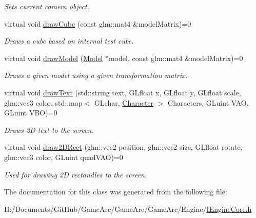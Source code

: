 \begin{DoxyCompactItemize}
\begin{DoxyCompactList}\small\item\em Sets current camera object. \end{DoxyCompactList}\item 
\hypertarget{class_i_engine_core_af24745492d6a7c8bd410a6849fbaf854}{virtual void \hyperlink{class_i_engine_core_af24745492d6a7c8bd410a6849fbaf854}{draw\+Cube} (const glm\+::mat4 \&model\+Matrix)=0}\label{class_i_engine_core_af24745492d6a7c8bd410a6849fbaf854}

\begin{DoxyCompactList}\small\item\em Draws a cube based on internal test cube. \end{DoxyCompactList}\item 
\hypertarget{class_i_engine_core_a45f78f207ced5253b7323f4dcb637c2d}{virtual void \hyperlink{class_i_engine_core_a45f78f207ced5253b7323f4dcb637c2d}{draw\+Model} (\hyperlink{class_model}{Model} $\ast$model, const glm\+::mat4 \&model\+Matrix)=0}\label{class_i_engine_core_a45f78f207ced5253b7323f4dcb637c2d}

\begin{DoxyCompactList}\small\item\em Draws a given model using a given transformation matrix. \end{DoxyCompactList}\item 
\hypertarget{class_i_engine_core_a4bd798d03cad0bdace8f0d08385c7236}{virtual void \hyperlink{class_i_engine_core_a4bd798d03cad0bdace8f0d08385c7236}{draw\+Text} (std\+::string text, G\+Lfloat x, G\+Lfloat y, G\+Lfloat scale, glm\+::vec3 color, std\+::map$<$ G\+Lchar, \hyperlink{struct_character}{Character} $>$ Characters, G\+Luint V\+A\+O, G\+Luint V\+B\+O)=0}\label{class_i_engine_core_a4bd798d03cad0bdace8f0d08385c7236}

\begin{DoxyCompactList}\small\item\em Draws 2\+D text to the screen. \end{DoxyCompactList}\item 
\hypertarget{class_i_engine_core_a0136cbb8addeca932ff73956f40bde1d}{virtual void \hyperlink{class_i_engine_core_a0136cbb8addeca932ff73956f40bde1d}{draw2\+D\+Rect} (glm\+::vec2 position, glm\+::vec2 size, G\+Lfloat rotate, glm\+::vec3 color, G\+Luint quad\+V\+A\+O)=0}\label{class_i_engine_core_a0136cbb8addeca932ff73956f40bde1d}

\begin{DoxyCompactList}\small\item\em Used for drawing 2\+D rectandles to the screen. \end{DoxyCompactList}\end{DoxyCompactItemize}


The documentation for this class was generated from the following file\+:\begin{DoxyCompactItemize}
\item 
H\+:/\+Documents/\+Git\+Hub/\+Game\+Arc/\+Game\+Arc/\+Game\+Arc/\+Engine/\hyperlink{_i_engine_core_8h}{I\+Engine\+Core.\+h}\end{DoxyCompactItemize}
